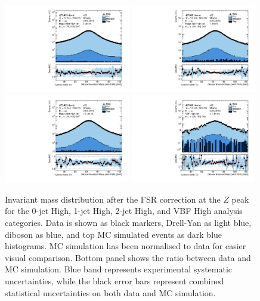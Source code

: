 \begin{figure}[h!]
  \centering
  \includegraphics[width=0.49\textwidth]{figures/hmumu/reso/0jet_1}
  \includegraphics[width=0.49\textwidth]{figures/hmumu/reso/1jet_1}
  \includegraphics[width=0.49\textwidth]{figures/hmumu/reso/2jet_4}
  \includegraphics[width=0.49\textwidth]{figures/hmumu/reso/2jet_1}
  \caption[Mass resolution validation in analysis categories]{
  Invariant mass distribution after the FSR correction at the $Z$ peak
  for the 0-jet High, 1-jet High, 2-jet High, and VBF High
  analysis categories. Data is shown as black markers,
  Drell-Yan as light blue, diboson as blue, and top MC simulated events as
  dark blue histograms. MC simulation has been normalised to data
  for easier visual comparison. Bottom panel shows the ratio between data and
  MC simulation. Blue band represents experimental systematic
  uncertainties, while the black error bars represent combined
  statistical uncertainties on both data and MC simulation.
  }
  \label{fig:hmumu:reso}
\end{figure}

